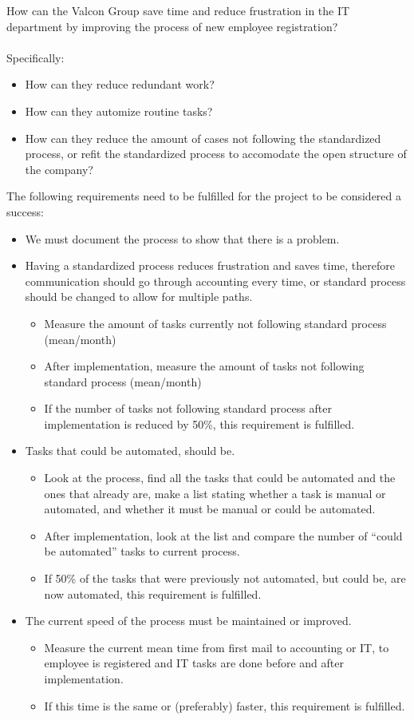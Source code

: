 How can the Valcon Group save time and reduce frustration in the IT department by improving the process of new employee registration?
\\\\
Specifically:
\begin{itemize}
\item How can they reduce redundant work?
\item How can they automize routine tasks?
\item How can they reduce the amount of cases not following the standardized process, or refit the standardized process to accomodate the open structure of the company?
\end{itemize}

The following requirements need to be fulfilled for the project to be considered a success:
\begin{itemize}
\item
We must document the process to show that there is a problem.
\item
Having a standardized process reduces frustration and saves time, therefore communication should go through accounting every time, or standard process should be changed to allow for multiple paths.
\begin{itemize}
\item
Measure the amount of tasks currently not following standard process (mean/month)
\item
After implementation, measure the amount of tasks not following standard process (mean/month)
\item
If the number of tasks not following standard process after implementation is reduced by 50\%, this requirement is fulfilled.
\end{itemize}
\item
Tasks that could be automated, should be.
\begin{itemize}
\item
Look at the process, find all the tasks that could be automated and the ones that already are, make a list stating whether a task is manual or automated, and whether it must be manual or could be automated.
\item
After implementation, look at the list and compare the number of “could be automated” tasks to current process.
\item
If 50\% of the tasks that were previously not automated, but could be, are now automated, this requirement is fulfilled.
\end{itemize}
\item
The current speed of the process must be maintained or improved.
\begin{itemize}
\item
Measure the current mean time from first mail to accounting or IT, to employee is registered and IT tasks are done before and after implementation.
\item
If this time is the same or (preferably) faster, this requirement is fulfilled.
\end{itemize}
\end{itemize}
